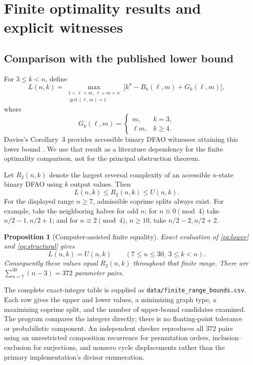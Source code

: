 \documentclass[11pt,a4paper]{article}
\numberwithin{equation}{section}
\newtheorem{proposition}[theorem]{Proposition}
\theoremstyle{definition}
\theoremstyle{remark}
\begin{document}
\section{Finite optimality results and explicit witnesses}\label{sec:finite}

\subsection{Comparison with the published lower bound}

For $3\le k<n$, define
\begin{equation}\label{eq:lower}
 L(n,k)=\max_{\substack{1<\ell<m,\ \ell+m=n\\\gcd(\ell,m)=1}}
 \bigl[k^n-B_k(\ell,m)+G_k(\ell,m)\bigr],
\end{equation}
where
\[
 G_k(\ell,m)=
 \begin{cases}
 m,&k=3,\\
 \ell m,&k\ge4.
 \end{cases}
\]
Davies's Corollary~3 provides accessible binary DFAO witnesses attaining
this lower bound \cite{Davies2017}. We use that result as a literature
dependency for the finite optimality comparison, not for the principal
obstruction theorem.

Let $R_2(n,k)$ denote the largest reversal complexity of an accessible
$n$-state binary DFAO using $k$ output values. Then
\[
 L(n,k)\le R_2(n,k)\le U(n,k).
\]
For the displayed range $n\ge7$, admissible coprime splits always exist.
For example, take the neighboring halves for odd $n$; for $n\equiv0\pmod4$
take $n/2-1,n/2+1$; and for $n\equiv2\pmod4$, $n\ge10$, take
$n/2-2,n/2+2$.

\begin{proposition}[Computer-assisted finite equality]\label{prop:finite}
Exact evaluation of \eqref{eq:lower} and \eqref{eq:structural} gives
\[
 L(n,k)=U(n,k)
 \qquad(7\le n\le30,\ 3\le k<n).
\]
Consequently these values equal $R_2(n,k)$ throughout that finite range.
There are $\sum_{n=7}^{30}(n-3)=372$ parameter pairs.
\end{proposition}

The complete exact-integer table is supplied as
\texttt{data/finite\_range\_bounds.csv}. Each row gives the upper and lower
values, a minimizing graph type, a maximizing coprime split, and the number
of upper-bound candidates examined. The program compares the integers
directly; there is no floating-point tolerance or probabilistic component.
An independent checker reproduces all $372$ pairs using an unrestricted
composition recurrence for permutation orders, inclusion--exclusion for
surjections, and nonzero cycle displacements rather than the primary
implementation's divisor enumeration.
\end{document}
